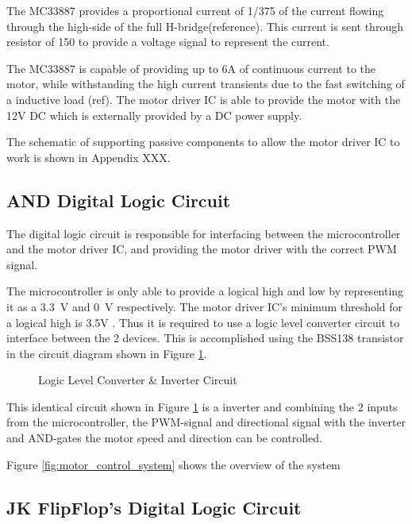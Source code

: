 \documentclass[a4paper,12pt]{article}
\begin{document}
	The MC33887 provides a proportional current of 1/375 of the current flowing through the high-side of the full H-bridge(reference). This current is sent through resistor of \SI{150}{\Omega} to provide a voltage signal to represent the current.
	
	The MC33887 is capable of providing up to 6A of continuous current to the motor, while withstanding the high current transients due to the fast switching of a inductive load (ref). The motor driver IC is able to provide the motor with the 12V DC which is externally provided by a DC power supply.
	
	The schematic of supporting passive components to allow the motor driver IC to work is shown in Appendix XXX.
	
	\subsection{AND Digital Logic Circuit}
	
	The digital logic circuit is responsible for interfacing between the microcontroller and the motor driver IC, and providing the motor driver with the correct PWM signal.
	
	The microcontroller is only able to provide a logical high and low by representing it as a \SI{3.3}{V} and \SI{0}{V} respectively. The motor driver IC's minimum threshold for a logical high is 3.5V \cite{motorIC}. Thus it is required to use a logic level converter circuit to interface between the 2 devices. This is accomplished using the BSS138 transistor in the circuit diagram shown in Figure \ref{fig:interterCirc}. 
	
	\begin{figure}[h]
		\centering
		
		\caption{Logic Level Converter \& Inverter Circuit}
		\label{fig:interterCirc}
	\end{figure}

	This identical circuit shown in Figure \ref{fig:interterCirc} is a inverter and combining the 2 inputs from the microcontroller, the PWM-signal and directional signal with the inverter and AND-gates the motor speed and direction can be controlled. 
	
	Figure \ref{fig:motor_control_system} shows the overview of the system
	
	\subsection{JK FlipFlop's Digital Logic Circuit}
	
\end{document}
